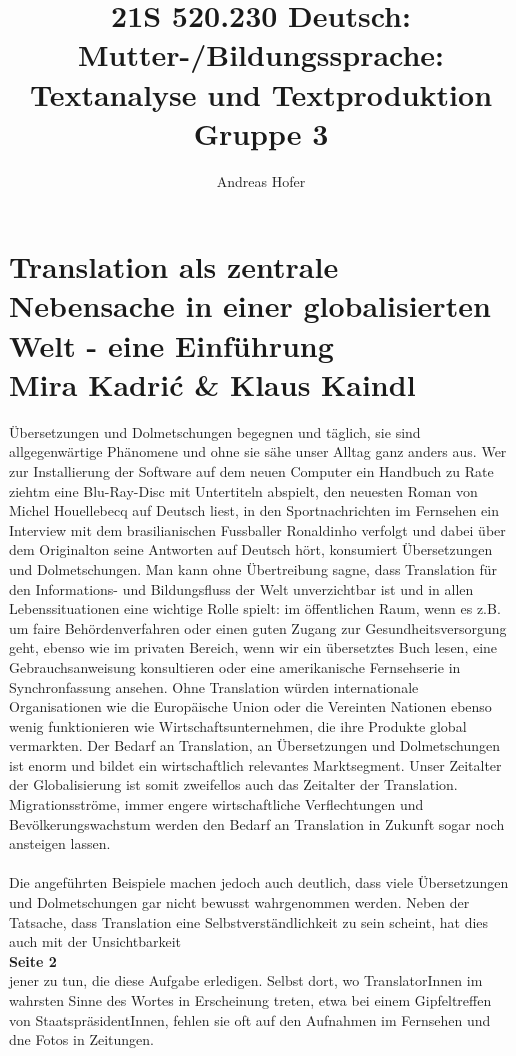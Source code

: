 \documentclass{article}
\title{\vspace{-3cm}21S 520.230 Deutsch: Mutter-/Bildungssprache: Textanalyse und Textproduktion Gruppe 3}
\author{Andreas Hofer}
\begin{document}
	\section*{Translation als zentrale Nebensache in einer globalisierten Welt - eine Einführung \\ {\footnotesize Mira Kadrić \& Klaus Kaindl}}
	Übersetzungen und Dolmetschungen begegnen und täglich, sie sind allgegenwärtige Phänomene und ohne sie sähe unser Alltag ganz anders aus. Wer zur Installierung der Software auf dem neuen Computer ein Handbuch zu Rate ziehtm eine Blu-Ray-Disc mit Untertiteln abspielt, den neuesten Roman von Michel Houellebecq auf Deutsch liest, in den Sportnachrichten im Fernsehen ein Interview mit dem brasilianischen Fussballer Ronaldinho verfolgt und dabei über dem Originalton seine Antworten auf Deutsch hört, konsumiert Übersetzungen und Dolmetschungen. Man kann ohne Übertreibung sagne, dass Translation für den Informations- und Bildungsfluss der Welt unverzichtbar ist und in allen Lebenssituationen eine wichtige Rolle spielt: im öffentlichen Raum, wenn es z.B. um faire Behördenverfahren oder einen guten Zugang zur Gesundheitsversorgung geht, ebenso wie im privaten Bereich, wenn wir ein übersetztes Buch lesen, eine Gebrauchsanweisung konsultieren oder eine amerikanische Fernsehserie in Synchronfassung ansehen. Ohne Translation würden internationale Organisationen wie die Europäische Union oder die Vereinten Nationen ebenso wenig funktionieren wie Wirtschaftsunternehmen, die ihre Produkte global vermarkten. Der Bedarf an Translation, an Übersetzungen und Dolmetschungen ist enorm und bildet ein wirtschaftlich relevantes Marktsegment. Unser Zeitalter der Globalisierung ist somit zweifellos auch das Zeitalter der Translation. Migrationsströme, immer engere wirtschaftliche Verflechtungen und Bevölkerungswachstum werden den Bedarf an Translation in Zukunft sogar noch ansteigen lassen. \\ \\
	Die angeführten Beispiele machen jedoch auch deutlich, dass viele Übersetzungen und Dolmetschungen gar nicht bewusst wahrgenommen werden. Neben der Tatsache, dass Translation eine Selbstverständlichkeit zu sein scheint, hat dies auch mit der Unsichtbarkeit \\
	\textbf{Seite 2} \\
	jener zu tun, die diese Aufgabe erledigen. Selbst dort, wo TranslatorInnen im wahrsten Sinne des Wortes in Erscheinung treten, etwa bei einem Gipfeltreffen von StaatspräsidentInnen, fehlen sie oft auf den Aufnahmen im Fernsehen und dne Fotos in Zeitungen. \\ \\
\end{document}
